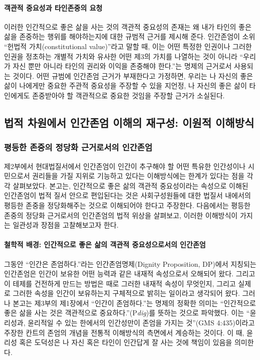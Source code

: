 \paragraph{객관적 중요성과 타인존중의 요청}

이러한 인간적으로 좋은 삶을 사는 것의 객관적 중요성의 존재는 왜 내가 타인의 좋은 삶을 존중하는 행위를 해야하는지에 대한 규범적 근거를 제시해 준다. 인간존엄이 소위 ``헌법적 가치(constitutional value)''라고 말할 때, 이는 어떤 특정한 인권이나 그러한 인권을 정초하는 개별적 가치와 유사한 어떤 제3의 가치를 나열하는 것이 아니라 ``우리가 자신 뿐만 아니라 타인의 권리와 이익을 존중해야 한다.''는 명제의 근거로서 사용되는 것이다. 어떤 규범에 인간존엄 근거가 부재한다고 가정하면, 우리는 나 자신의 좋은 삶이 나에게만 중요한 주관적 중요성을 주장할 수 있을 지언정, 나 자신의 좋은 삶이 타인에게도 존중받아야 할 객관적으로 중요한 것임을 주장할 근거가 소실된다.

\subsection{법적 차원에서 인간존엄 이해의 재구성: 이원적 이해방식}

\subsubsection{평등한 존중의 정당화 근거로서의 인간존엄}

제2부에서 현대법질서에서 인간존엄이 인간이 추구해야 할 어떤 특유한 인간성이나 시민으로서 권리들을 가질 지위로 기능하고 있다는 이해방식에는 한계가 있다는 점을 각각 살펴보았다. 본고는, 인간적으로 좋은 삶의 객관적 중요성이라는 속성으로 이해된 인간존엄이 법적 질서 안으로 편입된다는 것은 사회구성원들에 대한 법질서 내에서의 평등한 존중을 정당화해주는 것으로 이해되어야 한다고 주장한다. 다음에서는 평등한 존중의 정당화 근거로서의 인간존엄의 법적 위상을 살펴보고, 이러한 이해방식이 가지는 일관성과 장점을 고찰해보고자 한다.

\paragraph{철학적 배경: 인간적으로 좋은 삶의 객관적 중요성으로서의 인간존엄}

그동안 ``인간은 존엄하다.''라는 인간존엄명제(Dignity Proposition, DP)에서 지칭되는 인간존엄은 인간이 보유한 어떤 능력과 같은 내재적 속성으로서 오해되어 왔다. 그리고 이 테제를 건전하게 만드는 방법은 때로 그러한 내재적 속성이 무엇인지, 그리고 실제로 그러한 속성을 인간이 보유하는지 구체적으로 밝히는 일이라고 생각되어 왔다. 그러나 본고는 제3부의 제1장에서 ``인간이 존엄하다.''는 명제의 정확한 의미는 ``인간적으로 좋은 삶을 사는 것은 객관적으로 중요하다.''(P\emph{dig})를 뜻하는 것으로 파악했다. 이는 ``윤리성과, 윤리적일 수 있는 한에서의 인간성만이 존엄을 가지는 것''(GMS 4:435)이라고 주장한 칸트의 존엄의 개념을 전통적 이해방식의 측면에서 계승하는 것이다. 이 때, 윤리성 혹은 도덕성은 나 자신 혹은 타인이 인간답게 잘 사는 것에 책임이 있음을 의미한다.

